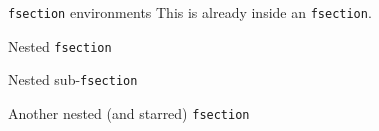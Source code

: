 \begin{fsection}{\texttt{fsection} environments}
    This is already inside an \texttt{fsection}.
    \begin{fsection}{Nested \texttt{fsection}}
        \begin{fsection}{Nested sub-\texttt{fsection}}
        \end{fsection}
    \end{fsection}
    \begin{fsection*}{Another nested (and starred) \texttt{fsection}}
    \end{fsection*}
\end{fsection}

